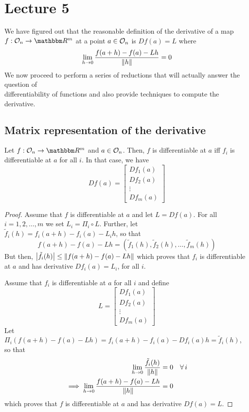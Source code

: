\documentclass[../Analysis-3]{subfiles}
\begin{document}
\chapter*{Lecture 5} %
\setcounter{chapter}{5} %
\setcounter{section}{0}

We have figured out that the reasonable definition of the derivative of a map $ f: \Op{n} \to \R^m $ at a point $ a \in \mathcal{O}_{n} $ is $ Df(a) = L $ where
\[ \lim_{h \to 0}  \frac{f(a+h)-f(a)-Lh}{\norm{h}} = 0 \]
We now proceed to perform a series of reductions that will actually answer the question of \\ 
differentiability of functions and also provide techniques to compute the derivative.

\section{Matrix representation of the derivative}

\begin{Thm}{}{}
  Let $ f: \Op{n} \to \R^m $ and $ a \in \mathcal{O}_{n} $. Then, $ f $ is differentiable at $ a $ iff $ f_i $ is differentiable at $ a $ for all $ i $. In that case, we have
  \[ Df(a) =
    \begin{bmatrix}
      Df_1(a) \\
      Df_2(a) \\
      \vdots  \\
      Df_m(a)
    \end{bmatrix} \]
\end{Thm}

\begin{proof}
  Assume that $ f $ is differentiable at $ a $ and let $ L = Df(a) $. For all $ i = 1,2,\dots,m $ we set $ L_i = \Pi_i \circ L $. Further, let $ \tilde{f}_i(h) = f_i(a+h)-f_i(a)-L_ih $, so that
  \[ f(a+h)-f(a)-Lh = (\tilde{f}_1(h), \tilde{f}_2(h), \dots, \tilde{f}_m(h)) \]
  But then, $ \abs{\tilde{f}_i(h)} \leq \norm{f(a+h)-f(a)-Lh} $ which proves that $ f_i $ is differentiable at $ a $ and has derivative $ Df_i(a) = L_i $, for all $ i $.
  \msk
  
  Assume that $ f_i $ is differentiable at $ a $ for all $ i $ and define
  \[ L =
    \begin{bmatrix}
      Df_1(a) \\
      Df_2(a) \\
      \vdots  \\
      Df_m(a)
    \end{bmatrix} \]
  Let $ \Pi_i(f(a+h)-f(a)-Lh) = f_i(a+h)-f_i(a)-Df_i(a)h =  \tilde{f}_i(h) $, so that
  \begin{align*}
    \lim_{h \to 0} \frac{\tilde{f}_i(h)}{\norm{h}}          & = 0 \quad \forall \, i \\
    \implies \lim_{h \to 0} \frac{f(a+h)-f(a)-Lh}{\norm{h}} & = 0
  \end{align*}
  which proves that $ f $ is differentiable at $ a $ and has derivative $ Df(a) = L $.
\end{proof}
\end{document}
